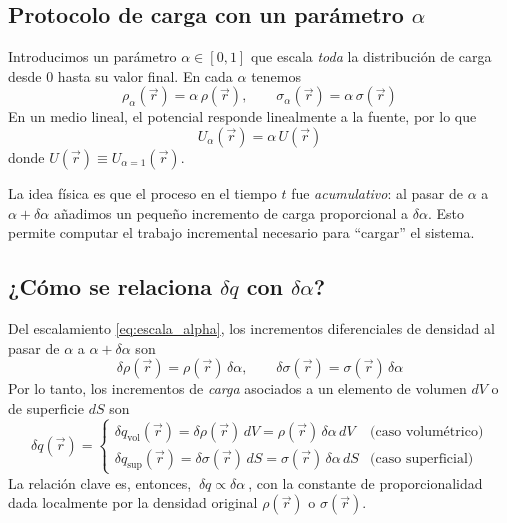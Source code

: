 \documentclass{article}
\begin{document}
\subsection{Protocolo de carga con un parámetro \texorpdfstring{$\alpha$}{alpha}}
Introducimos un parámetro $\alpha\in[0,1]$ que escala \emph{toda} la distribución de carga desde $0$ hasta su valor final. En cada $\alpha$ tenemos
\begin{equation}
\label{eq:escala_alpha}
\rho_\alpha(\vec r)=\alpha\,\rho(\vec r),\qquad
\sigma_\alpha(\vec r)=\alpha\,\sigma(\vec r)
\end{equation}
En un medio lineal, el potencial responde linealmente a la fuente, por lo que
\begin{equation}
\label{eq:potencial_alpha_lineal}
U_\alpha(\vec r)=\alpha\,U(\vec r)
\end{equation}
donde $U(\vec r)\equiv U_{\alpha=1}(\vec r)$.

La idea física es que el proceso en el tiempo $t$ fue \emph{acumulativo}: al pasar de $\alpha$ a $\alpha+\delta\alpha$ añadimos un pequeño incremento de carga proporcional a $\delta\alpha$. Esto permite computar el trabajo incremental necesario para ``cargar'' el sistema.

\subsection{¿Cómo se relaciona \texorpdfstring{$\delta q$}{delta q} con \texorpdfstring{$\delta\alpha$}{delta alpha}?}
Del escalamiento \eqref{eq:escala_alpha}, los incrementos diferenciales de densidad al pasar de $\alpha$ a $\alpha+\delta\alpha$ son
\begin{equation}
\label{eq:incrementos_densidad}
\delta\rho(\vec r)=\rho(\vec r)\,\delta\alpha,\qquad
\delta\sigma(\vec r)=\sigma(\vec r)\,\delta\alpha
\end{equation}
Por lo tanto, los incrementos de \emph{carga} asociados a un elemento de volumen $dV$ o de superficie $dS$ son
\begin{equation}
\label{eq:deltaq_casos}
\delta q(\vec r)=
\begin{cases}
\delta q_{\text{vol}}(\vec r)=\delta\rho(\vec r)\,dV=\rho(\vec r)\,\delta\alpha\,dV & \text{(caso volumétrico)}\\[4pt]
\delta q_{\text{sup}}(\vec r)=\delta\sigma(\vec r)\,dS=\sigma(\vec r)\,\delta\alpha\,dS & \text{(caso superficial)}
\end{cases}
\end{equation}
La relación clave es, entonces, \(\boxed{\ \delta q \propto \delta\alpha\ }\), con la constante de proporcionalidad dada localmente por la densidad original \(\rho(\vec r)\) o \(\sigma(\vec r)\).
\end{document}
